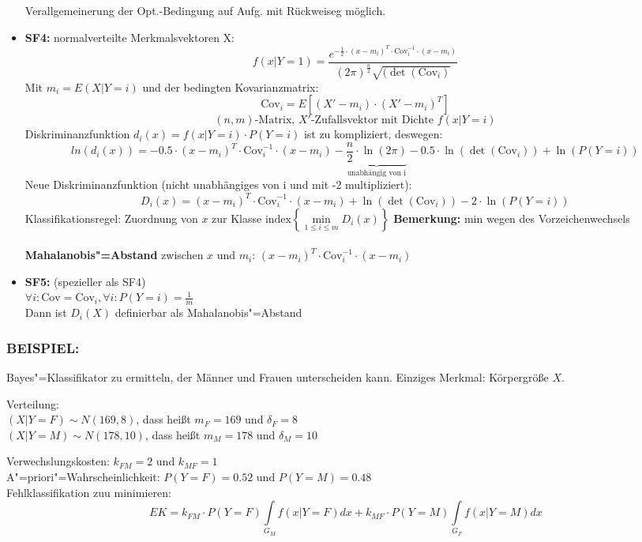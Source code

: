 \documentclass[a4paper,12pt]{scrreprt}
\newcommand{\Nb}[1]{\textbf{#1}}
\newcommand{\itemd}[1]{\item{\textbf{#1}} }
\begin{document}
\begin{itemize}
	Verallgemeinerung der Opt.-Bedingung auf Aufg. mit Rückweiseg möglich.\\
	
	\itemd{SF4:} normalverteilte Merkmalsvektoren X:
		$$f(x|Y=1) = \frac{e^{-\frac{1}{2}\cdot(x-m_i)^T\cdot \text{Cov}_i^{-1}\cdot(x-m_i)}}{(2\pi)^\frac{n}{2}\sqrt{(\det(\text{Cov}_i)}}$$
		Mit $m_i=E(X|Y=i)$ und der bedingten Kovarianzmatrix:
		$$\text{Cov}_i=E{[(X'-m_i)\cdot(X'-m_i)^T]}$$
		$$ (n,m) \text{-Matrix, } X' \text{-Zufallsvektor mit Dichte } f(x|Y=i) $$
		Diskriminanzfunktion  $d_i(x)=f(x|Y=i)\cdot P(Y=i)$ ist zu
		kompliziert, deswegen:
		$$ln(d_i(x))=-0.5\cdot(x-m_i)^T\cdot\text{Cov}_i^{-1}\cdot(x-m_i)-\underbrace{\frac{n}{2}\cdot\ln(2\pi)}_{\text{unabhängig von i}}-0.5\cdot\ln(\det(\text{Cov}_i))+\ln(P(Y=i))$$
		Neue Diskriminanzfunktion (nicht unabhängiges von i und mit -2 multipliziert):
		$$D_i(x)=(x-m_i)^T\cdot\text{Cov}_i^{-1}\cdot(x-m_i)+\ln(\det(\text{Cov}_i))-2\cdot\ln(P(Y=i))$$
		Klassifikationsregel: Zuordnung von $x$ zur Klasse
		$\text{index}\left\{ \min\limits_{1\le i\le m}D_i(x) \right\}$
		\Nb{Bemerkung:} min wegen des Vorzeichenwechsels\\
		\\
		\Nb{Mahalanobis"=Abstand} zwischen $x$ und $m_i$:
		$(x-m_i)^T\cdot\text{Cov}_i^{-1}\cdot(x-m_i)$

	\itemd{SF5:} (spezieller als SF4)\\
		$\forall i: \text{Cov}=\text{Cov}_i, \forall i: P(Y=i)=\frac{1}{m}$
		\\Dann ist $D_i(X)$ definierbar als Mahalanobis"=Abstand
	
\end{itemize}

\subsubsection{BEISPIEL:}
Bayes"=Klassifikator zu ermitteln, der Männer und Frauen
unterscheiden kann. Einziges Merkmal: Körpergröße $X$.

Verteilung:\\ $(X|Y=F)\sim N(169,8)$, dass heißt $m_F=169$ und
$\delta_F=8$\\
$(X|Y=M)\sim N(178,10)$, dass heißt $m_M=178$ und
$\delta_M=10$

Verwechslungskosten: $k_{FM}=2$ und $k_{MF}=1$\\
A"=priori"=Wahrscheinlichkeit:
$P(Y=F)=0.52$ und $P(Y=M)=0.48$\\
Fehlklassifikation zuu minimieren:\\
$$EK=k_{FM}\cdot P(Y=F)\int\limits_{G_M}f(x|Y=F)dx+k_{MF}\cdot
P(Y=M)\int\limits_{G_F}f(x|Y=M)dx$$
\end{document}
